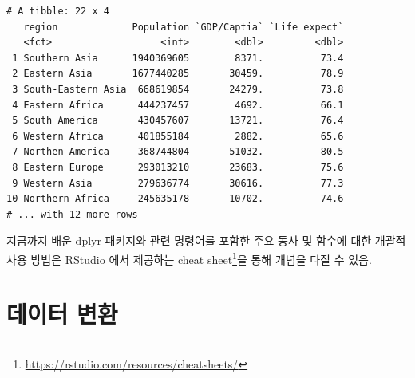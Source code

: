 \documentclass[
  11pt,
]{krantz}
\newenvironment{Shaded}{\begin{snugshade}}{\end{snugshade}}
\newcommand{\DataTypeTok}[1]{\textcolor[rgb]{0.27,0.27,0.27}{#1}}
\newcommand{\DecValTok}[1]{\textcolor[rgb]{0.06,0.06,0.06}{#1}}
\newcommand{\KeywordTok}[1]{\textcolor[rgb]{0.27,0.27,0.27}{\textbf{#1}}}
\newcommand{\NormalTok}[1]{#1}
\newcommand{\OperatorTok}[1]{\textcolor[rgb]{0.43,0.43,0.43}{\textbf{#1}}}
\newcommand{\OtherTok}[1]{\textcolor[rgb]{0.37,0.37,0.37}{#1}}
\newcommand{\StringTok}[1]{\textcolor[rgb]{0.5,0.5,0.5}{#1}}
\renewcommand{\href}[2]{#2\footnote{\url{#1}}}
\let\BeginKnitrBlock\begin \let\EndKnitrBlock\end
\begin{document}
\footnotesize

\begin{Shaded}
\end{Shaded}

\begin{verbatim}
# A tibble: 22 x 4
   region             Population `GDP/Captia` `Life expect`
   <fct>                   <int>        <dbl>         <dbl>
 1 Southern Asia      1940369605        8371.          73.4
 2 Eastern Asia       1677440285       30459.          78.9
 3 South-Eastern Asia  668619854       24279.          73.8
 4 Eastern Africa      444237457        4692.          66.1
 5 South America       430457607       13721.          76.4
 6 Western Africa      401855184        2882.          65.6
 7 Northen America     368744804       51032.          80.5
 8 Eastern Europe      293013210       23683.          75.6
 9 Western Asia        279636774       30616.          77.3
10 Northern Africa     245635178       10702.          74.6
# ... with 12 more rows
\end{verbatim}

\normalsize

\footnotesize

\BeginKnitrBlock{rmdtip}
지금까지 배운 dplyr 패키지와 관련 명령어를 포함한 주요 동사 및 함수에 대한 개괄적 사용 방법은 RStudio 에서 제공하는 \href{https://rstudio.com/resources/cheatsheets/}{cheat sheet}을 통해 개념을 다질 수 있음.
\EndKnitrBlock{rmdtip}

\normalsize

\hypertarget{data-transformation}{%
\section{데이터 변환}\label{data-transformation}}
\end{document}
